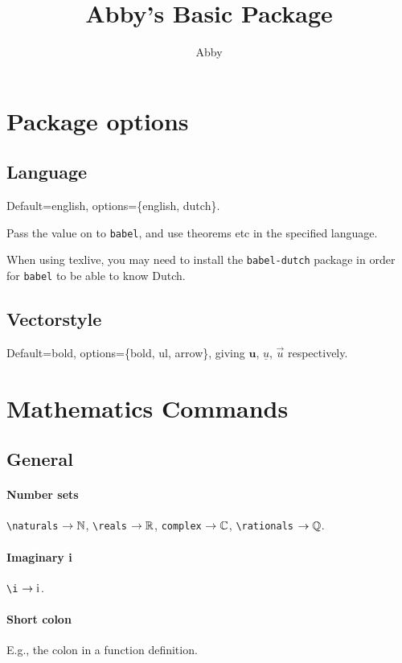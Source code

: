 \documentclass[11pt]{article}
\title{Abby's Basic Package}
\author{Abby}
\begin{document}
    \maketitle
    \clearpage
    \tableofcontents
    \clearpage

    \section{Package options}
    \subsection{Language}
    Default=english, options=\{english, dutch\}.

    Pass the value on to \verb|babel|, and use theorems etc in the specified language.

    \begin{note}
        When using texlive, you may need to install the \verb|babel-dutch| package in order for \verb|babel| to be able to know Dutch.
    \end{note}

    \subsection{Vectorstyle}
    Default=bold, options=\{bold, ul, arrow\}, giving $\bm u$, $\underline u$, $\vec u$ respectively.

    \section{Mathematics Commands}
    \subsection{General}

    \paragraph{Number sets} \verb|\naturals| $\to \mathbb{N}$, \verb|\reals| $\to \mathbb{R}$, \verb|complex| $\to \mathbb{C}$, \verb|\rationals| $\to \mathbb{Q}$.

    \paragraph{Imaginary i}
    \verb|\i| $\to \mathrm{i}\mkern1mu$.

    \paragraph{Short colon} E.g., the colon in a function definition.
\end{document}

